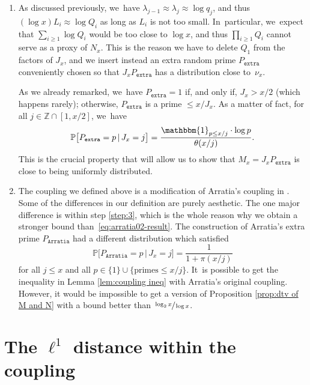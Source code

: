 \documentclass[10pt,a4paper]{amsart}
\newenvironment{enumeratea}
{\bgroup\def\theenumi{\alph{enumi}}\begin{enumerate}}
{\end{enumerate}\egroup}
\newcommand{\ZZ}{\mathbb{Z}}
\newcommand{\PP}{\mathbb{P}}
\newcommand{\one}{\mathbbm{1}}
\newcommand{\pextra}{P_{\mathtt{extra}}}
\newcommand{\parratia}{P_{\mathtt{Arratia}}}
\newcommand{\bg}{\big}
\theoremstyle{plain}
\theoremstyle{definition}
\begin{document}
\begin{enumeratea}
\item\label{rem:couplinga}
As discussed previously, we~have $\lambda_{j-1}\approx \lambda_j\approx \log q_j$, and thus $(\log x)L_i \approx \log Q_i$ as long as $L_i$ is not too small. In~particular, we~expect that $\sum_{i \ge 1} \log Q_i$ would be too close to $\log x$, and thus $\prod_{i\ge1}Q_i$ cannot serve as a proxy of $N_x$. This is the reason we have to delete $Q_1$ from the factors of $J_x$, and we insert instead an extra random prime $\pextra$ conveniently chosen so that $J_x\pextra$ has a distribution close to~$\nu_x$.

As we already remarked, we~have $\pextra=1$ if, and only if, $J_x > x/2$ (which happens rarely); otherwise, $\pextra$ is a prime $\le x/J_x$. As a matter of fact, for all $j\in\ZZ\cap[1,x/2]$, we~have
\begin{equation}
\label{eq:distribution of Pextra}
\PP\bg[\pextra = p\,|\, J_x = j\bg] = \frac{\one_{p\le x/j}\cdot\log p}{\theta(x/j)}.
\end{equation}
This is the crucial property that will allow us to show that $M_x=J_x\pextra$ is close to being uniformly distributed.

\item\label{rem:couplingb}
The coupling we defined above is a modification of Arratia's coupling in \cite{Arratia02}. Some of the differences in our definition are purely aesthetic. The one major difference is within step \eqref{step:3}, which is the whole reason why we obtain a stronger bound than~\eqref{eq:arratia02-result}. The construction of Arratia's extra prime $\parratia$ had a different distribution which satisfied
\begin{equation}
\label{eq:extraprime-arratia}
\PP\bg[\parratia = p\,|\, J_x=j\bg] = \frac{1}{1+\pi(x/j)}
\end{equation}
for all $j\le x$ and all $p \in \{1\}\cup\{\text{primes}\le x/j\}$. It~is possible to get the inequality in Lemma \ref{lem:coupling ineq} with Arratia's original coupling. However, it would be impossible to get a version of Proposition \ref{prop:dtv of M and N} with a bound better than $\sfrac{\log_2x}{\log x}$.
\end{enumeratea}

\section{The \texorpdfstring{$\ell^1$}{l1} distance within the coupling}\label{sec:proof of Lemma coupling ineq}
\end{document}
